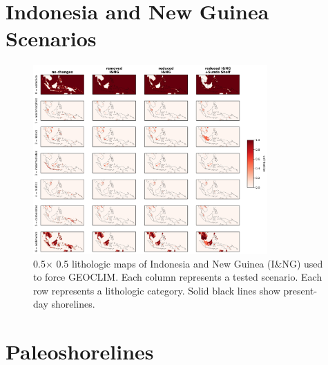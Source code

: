 \documentclass[11pt,letterpaper]{article}
\newcommand{\degrees}{\textdegree\xspace}
\begin{document}
\section*{Indonesia and New Guinea Scenarios}


\begin{figure}[h!]
    \centering
    \includegraphics[width=0.8\textwidth]{Manuscript/Figures/ING_fracs.jpg}
    \caption{0.5\degrees $\times$ 0.5\degrees lithologic maps of Indonesia and New Guinea (I\&NG) used to force GEOCLIM. Each column represents a tested scenario. Each row represents a lithologic category. Solid black lines show present-day shorelines.}
    \label{fig:ING_fracs}
\end{figure}

\section*{Paleoshorelines}
\end{document}
